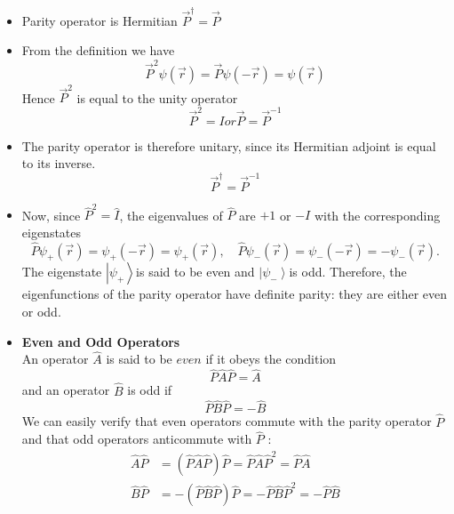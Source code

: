  \begin{note}
 	\begin{itemize}
 		\item Parity operator is Hermitian $\vec{P}^{\dagger}=\vec{P}$
 		\item From the definition we have\\
 		$$\vec{P}^2 \psi(\vec{r})=\vec{P}\psi(-\vec{r})=\psi(\vec{r})$$
 		Hence $\vec{P}^2$ is equal to the unity operator
 		$$\vec{P}^2=I or \vec{P}=\vec{P}^{-1}$$
 		\item The parity operator is therefore unitary, since its Hermitian adjoint is equal to its inverse.\\
 		$$\vec{P}^{\dagger}=\vec{P}^{-1}$$ 
 		\item Now, since $\hat{P}^{2}=\hat{I}$, the eigenvalues of $\hat{P}$ are $+1$ or $-I$ with the corresponding eigenstates
 		$$
 		\hat{P} \psi_{+}(\vec{r})=\psi_{+}(-\vec{r})=\psi_{+}(\vec{r}), \quad \hat{P} \psi_{-}(\vec{r})=\psi_{-}(-\vec{r})=-\psi_{-}(\vec{r}) .
 		$$
 		The eigenstate $\left|\psi_{+}\right\rangle$is said to be even and $\left|\psi_{-}\right\rangle$is odd. Therefore, the eigenfunctions of the parity operator have definite parity: they are either even or odd.
 		\item \textbf{Even and Odd Operators}\\
 		An operator $\hat{A}$ is said to be $e v e n$ if it obeys the condition
 		$$
 		\hat{P} \hat{A} \hat{P}=\hat{A}
 		$$
 		and an operator $\hat{B}$ is odd if
 		$$
 		\hat{P} \hat{B} \hat{P}=-\hat{B}
 		$$
 		We can easily verify that even operators commute with the parity operator $\hat{P}$ and that odd operators anticommute with $\hat{P}$ :
 		$$
 		\begin{aligned}
 		\hat{A} \hat{P} &=(\hat{P} \hat{A} \hat{P}) \hat{P}=\hat{P} \hat{A} \hat{P}^{2}=\hat{P}\hat{A} \\
 		\hat{B} \hat{P} &=-(\hat{P} \hat{B} \hat{P}) \hat{P}=-\hat{P} \hat{B} \hat{P}^{2}=-\hat{P} \hat{B}
 		\end{aligned}
 		$$
 	\end{itemize}
 \end{note}

